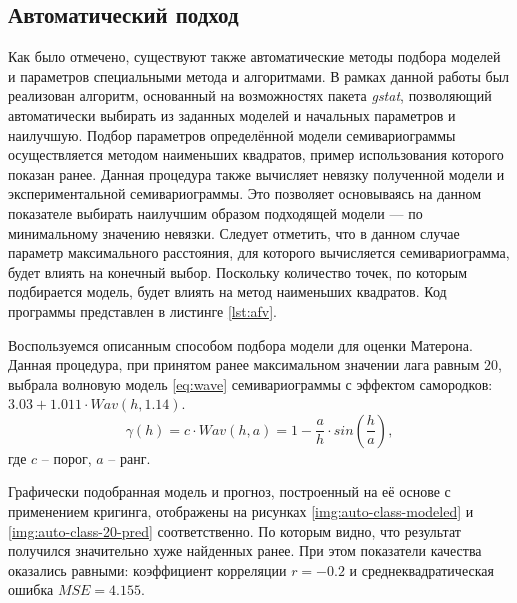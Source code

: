 
\subsection{Автоматический подход} %
\label{sec:autovar}

Как было отмечено, существуют также автоматические методы подбора моделей и параметров специальными метода и алгоритмами. В рамках данной работы был реализован алгоритм, основанный на возможностях пакета \textit{gstat}, позволяющий автоматически выбирать из заданных моделей и начальных параметров и наилучшую. Подбор параметров определённой модели семивариограммы осуществляется методом наименьших квадратов, пример использования которого показан ранее. Данная процедура также вычисляет невязку полученной модели и экспериментальной семивариограммы. Это позволяет основываясь на данном показателе выбирать наилучшим образом подходящей модели --- по минимальному значению невязки. Следует отметить, что в данном случае параметр максимального расстояния, для которого вычисляется семивариограмма, будет влиять на конечный выбор. Поскольку количество точек, по которым подбирается модель, будет влиять на метод наименьших квадратов. Код программы представлен в листинге \ref{lst:afv}.

Воспользуемся описанным способом подбора модели для оценки Матерона. Данная процедура, при принятом ранее максимальном значении лага равным $ 20 $, выбрала волновую модель \eqref{eq:wave} семивариограммы с эффектом самородков: $ 3.03 + 1.011 \cdot Wav(h, 1.14) $.
\begin{equation}
\label{eq:wave}
	\gamma(h) = c \cdot Wav(h, a) = 1 - \frac{a}{h} \cdot sin(\frac{h}{a}),
\end{equation}
где $ c $ -- порог, $ a $ -- ранг.

Графически подобранная модель и прогноз, построенный на её основе с применением кригинга, отображены на рисунках \ref{img:auto-class-modeled} и \ref{img:auto-class-20-pred} соответственно. По которым видно, что результат получился значительно хуже найденных ранее. При этом показатели качества оказались равными: коэффициент корреляции $ r = -0.2 $ и среднеквадратическая ошибка $ MSE = 4.155 $.

